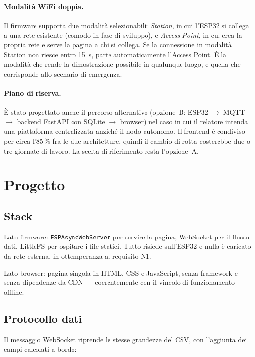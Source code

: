 \paragraph{Modalità WiFi doppia.} Il firmware supporta due modalità selezionabili:
\emph{Station}, in cui l'ESP32 si collega a una rete esistente (comodo in fase di
sviluppo), e \emph{Access Point}, in cui crea la propria rete e serve la pagina a
chi si collega. Se la connessione in modalità Station non riesce entro 15~s, parte
automaticamente l'Access Point. È la modalità che rende la dimostrazione possibile
in qualunque luogo, e quella che corrisponde allo scenario di emergenza.

\paragraph{Piano di riserva.} È stato progettato anche il percorso alternativo
(opzione~B: ESP32 $\to$ MQTT $\to$ backend FastAPI con SQLite $\to$ browser) nel
caso in cui il relatore intenda una piattaforma centralizzata anziché il nodo
autonomo. Il frontend è condiviso per circa l'85\,\% fra le due architetture, quindi
il cambio di rotta costerebbe due o tre giornate di lavoro. La scelta di riferimento
resta l'opzione~A.

\section{Progetto}
\label{sec:webui-progetto}

\subsection{Stack}

Lato firmware: \texttt{ESPAsyncWebServer} per servire la pagina, WebSocket per il
flusso dati, LittleFS per ospitare i file statici. Tutto risiede sull'ESP32 e nulla
è caricato da rete esterna, in ottemperanza al requisito N1.

Lato browser: pagina singola in HTML, CSS e JavaScript, senza framework e senza
dipendenze da CDN --- coerentemente con il vincolo di funzionamento offline.

\subsection{Protocollo dati}

Il messaggio WebSocket riprende le stesse grandezze del CSV, con l'aggiunta dei campi
calcolati a bordo:


